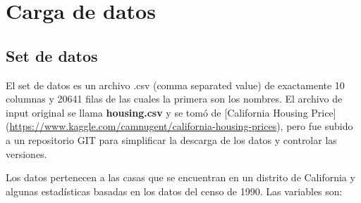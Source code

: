 \documentclass[]{article}
\begin{document}
\section{Carga de datos}\label{carga-de-datos}

\subsection{Set de datos}\label{set-de-datos}

El set de datos es un archivo .csv (comma separated value) de
exactamente 10 columnas y 20641 filas de las cuales la primera son los
nombres. El archivo de input original se llama \textbf{housing.csv} y se
tomó de {[}California Housing Price{]}
(\url{https://www.kaggle.com/camnugent/california-housing-prices}), pero
fue subido a un repositorio GIT para simplificar la descarga de los
datos y controlar las versiones.

Los datos pertenecen a las casas que se encuentran en un distrito de
California y algunas estadísticas basadas en los datos del censo de
1990. Las variables son:
\end{document}
